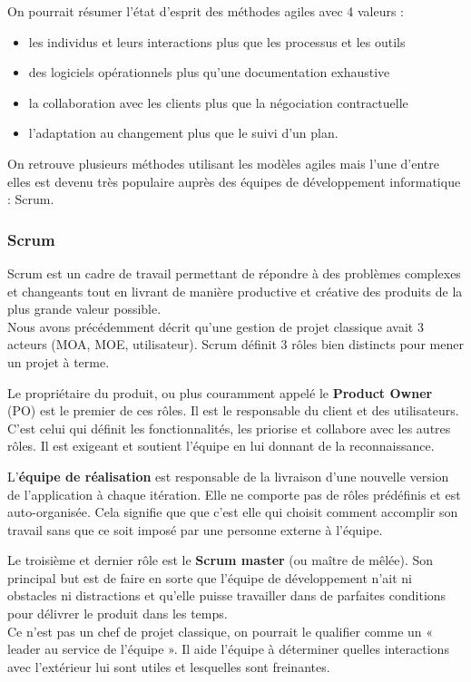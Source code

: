 \documentclass[12pt]{report}
\begin{document}
On pourrait résumer l'état d'esprit des méthodes agiles avec 4 valeurs :
\begin{itemize}
\item les individus et leurs interactions plus que les processus et les outils
\item des logiciels opérationnels plus qu'une documentation exhaustive
\item la collaboration avec les clients plus que la négociation contractuelle
\item l'adaptation au changement plus que le suivi d'un plan\cite{gitagile}.
\end{itemize}
On retrouve plusieurs méthodes utilisant les modèles agiles mais l'une d'entre elles est devenu très populaire auprès des équipes de développement informatique : Scrum.

\subsubsection{Scrum}

Scrum est un cadre de travail permettant de répondre à des problèmes complexes et changeants tout en livrant de manière productive et créative des produits de la plus grande valeur possible\cite{gitagile}.~~\\
Nous avons précédemment décrit qu'une gestion de projet classique avait 3 acteurs (MOA, MOE, utilisateur). Scrum définit 3 rôles bien distincts pour mener un projet à terme.

Le propriétaire du produit, ou plus couramment appelé le \textbf{Product Owner} (PO) est le premier de ces rôles. Il est le responsable du client et des utilisateurs. C'est celui qui définit les fonctionnalités, les priorise et collabore avec les autres rôles. Il est exigeant et soutient l'équipe en lui donnant de la reconnaissance\cite{wikienscrum}.

L'\textbf{équipe de réalisation} est responsable de la livraison d'une nouvelle version de l'application à chaque itération. Elle ne comporte pas de rôles prédéfinis et est auto-organisée. Cela signifie que que c'est elle qui choisit comment accomplir son travail sans que ce soit imposé par une personne externe à l'équipe.

Le troisième et dernier rôle est le \textbf{Scrum master} (ou maître de mêlée). Son principal but est de faire en sorte que l'équipe de développement n'ait ni obstacles ni distractions et qu'elle puisse travailler dans de parfaites conditions pour délivrer le produit dans les temps.~~\\
Ce n'est pas un chef de projet classique, on pourrait le qualifier comme un « leader au service de l'équipe ». Il aide l'équipe à déterminer quelles interactions avec l'extérieur lui sont utiles et lesquelles sont freinantes.
\end{document}
